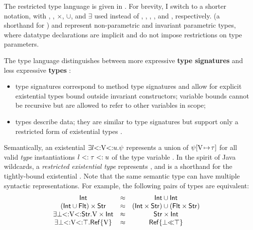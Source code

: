 The restricted type language is given in .
For brevity, I switch to a shorter notation, with \tyany, \tybot, 
$\times$, $\cup$, and $\exists$ used instead of
, , , , and ,
respectively. \iname (a shorthand for \tyinv\iname{}) and 
\tyinv\iname{\ldots} represent
non-parametric and invariant parametric types, where datatype
declarations are implicit and do not impose restrictions on type parameters.

The type language distinguishes between more expressive
\textbf{type signatures} \tysig
and less expressive \textbf{types} \ty:
\begin{itemize}
    \item type signatures \tysig correspond to method type signatures
      and allow for explicit existential types bound outside
      invariant constructors; variable bounds cannot be recursive but are
      allowed to refer to other variables in scope;
    \item types \ty describe data; they are similar to type signatures
      but support only a restricted form of existential types
      \tyinv\iname\rexvars.
\end{itemize}
Semantically, an existential $\exists l{\operatorname{<:}}\mathrm{V}{\operatorname{<:}}u.\psi$ 
represents a union of $\psi[\mathrm{V}\!\mapsto\!\tau]$ for all valid
\emph{type} instantiations $l <: \tau <: u$ of the type variable \vany.
In the spirit of Java wildcards, a \emph{restricted existential type} 
\tyinv{} %
represents
,
and \tyinv{} is a shorthand for the tightly-bound existential
\tyinv{}.
Note that the same semantic type can have multiple syntactic representations.
For example, the following pairs of types are equivalent:
\[
\begin{array}{ccc}
    \mathsf{Int} &\approx& 
        \mathsf{Int} \cup \mathsf{Int} \\
    (\mathsf{Int} \cup \mathsf{Flt}) \times \mathsf{Str} &\approx&
        (\mathsf{Int} \times \mathsf{Str}) \cup (\mathsf{Flt} \times \mathsf{Str}) \\
    \exists\bot{\operatorname{<:}}\mathrm{V}{\operatorname{<:}}\mathsf{Str}.\mathrm{V} \times \mathsf{Int} &\approx& 
        \mathsf{Str} \times \mathsf{Int} \\
    \exists\bot{\operatorname{<:}}\mathrm{V}{\operatorname{<:}}\top.\mathsf{Ref}\{\mathrm{V}\} &\approx&
        \mathsf{Ref}\{\bot{\operatorname{\ll}}\top\} \\
\end{array}
\]

